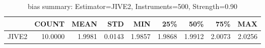 \begin{table}[ht]
\centering
\caption{bias summary: Estimator=JIVE2, Instruments=500, Strength=0.90}
\begin{tabular}{lrrrrrrrr}
\toprule
 & COUNT & MEAN & STD & MIN & 25\% & 50\% & 75\% & MAX \\
\midrule
JIVE2 & 10.0000 & 1.9981 & 0.0143 & 1.9857 & 1.9868 & 1.9912 & 2.0073 & 2.0256 \\
\bottomrule
\end{tabular}
\end{table}
